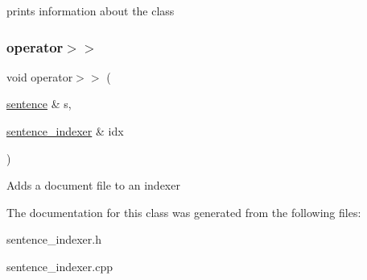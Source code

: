 prints information about the class \mbox{\label{classsentence__indexer_aad9b25bf223fbb0d7eed5a168cb702ec}} 
\subsubsection{\texorpdfstring{operator$>$$>$}{operator>>}}
{\footnotesize\ttfamily void operator$>$$>$ (\begin{DoxyParamCaption}\item[{\hyperlink{classsentence}{sentence} \&}]{s,  }\item[{\hyperlink{classsentence__indexer}{sentence\+\_\+indexer} \&}]{idx }\end{DoxyParamCaption})\hspace{0.3cm}{\ttfamily [friend]}}

Adds a document file to an indexer 

The documentation for this class was generated from the following files\+:\begin{DoxyCompactItemize}
\item 
sentence\+\_\+indexer.\+h\item 
sentence\+\_\+indexer.\+cpp\end{DoxyCompactItemize}
